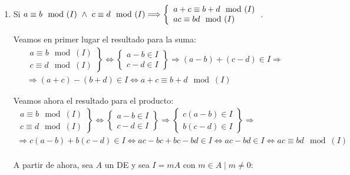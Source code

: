\begin{enumerate}
    \item Si $ a\equiv b\mod(I) \ \land \  c\equiv d\mod(I) \Longrightarrow \left\{ \begin{array}{l}
        a+c\equiv b+d\mod(I) \\
        ac\equiv bd\mod(I)
    \end{array} \right.$.

    Veamos en primer lugar el resultado para la suma:
    \begin{multline*}
        \left. \begin{array}{l}
            a\equiv b\mod(I) \\
            c\equiv d\mod(I)
        \end{array} \right\} \Longleftrightarrow \left\{ \begin{array}{l}
            a-b \in I \\
            c-d \in I
        \end{array} \right\} \Longrightarrow (a-b)+(c-d) \in I \Longrightarrow \\
        \Longrightarrow(a+c)-(b+d) \in I \Longleftrightarrow a+c \equiv b+d\mod(I)
    \end{multline*}

    Veamos ahora el resultado para el producto:
    \begin{multline*}
        \left. \begin{array}{l}
            a\equiv b\mod(I) \\
            c\equiv d\mod(I)
        \end{array} \right\} \Longleftrightarrow \left\{ \begin{array}{l}
            a-b \in I \\
            c-d \in I
        \end{array} \right\} \Longrightarrow \left\{ \begin{array}{l}
            c(a-b) \in I \\
            b(c-d) \in I
        \end{array} \right\} \Longrightarrow \\
        \Longrightarrow c(a-b) + b(c-d) \in I \Longleftrightarrow ac-bc+bc-bd \in I \Longleftrightarrow ac - bd \in I \Longleftrightarrow
        ac\equiv bd\mod(I)
    \end{multline*}\\

    \noindent A partir de ahora, sea $A$ un DE y sea $I=mA$ con $m \in A \mid m \neq 0$:\\


\end{enumerate}
